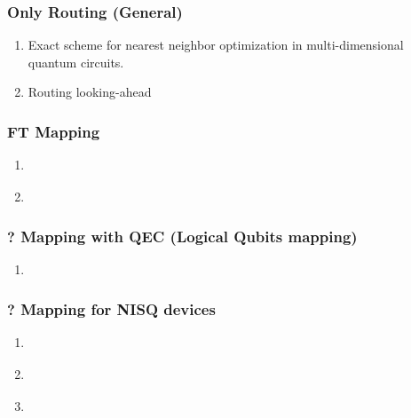 \documentclass[11pt]{article}
\begin{document}
\subsubsection{Only Routing (General)}
\label{sec:orgf40dc4d}

\begin{enumerate}
\item \cite{Lye_2015}
\label{sec:orgf494bed}

Exact scheme for nearest neighbor optimization in multi-dimensional quantum circuits.

\item \cite{Wille_2016}
\label{sec:org112e05d}

Routing looking-ahead
\end{enumerate}

\subsubsection{FT Mapping}
\label{sec:orgcd6a981}

\begin{enumerate}
\item \cite{hwang18:hierar_system_mappin_large_scale}
\label{sec:org1c0ee1a}

\item \cite{murphy18:contr}
\label{sec:org0325438}
\end{enumerate}

\subsubsection{? Mapping with QEC (Logical Qubits mapping)}
\label{sec:orgd9b4815}
\begin{enumerate}
\item \cite{Lao_2018}
\label{sec:org208a8e0}
\end{enumerate}
\subsubsection{? Mapping for NISQ devices}
\label{sec:org123bac4}

\begin{enumerate}
\item \cite{tannu18:case_variab_aware_polic_nisq}
\label{sec:org47f18ec}

\item \cite{paler18:influen_initial_qubit_placem_durin}
\label{sec:org37ea908}

\item \cite{paler18:nisq}
\label{sec:orgabb7d22}
\end{enumerate}
\end{document}
